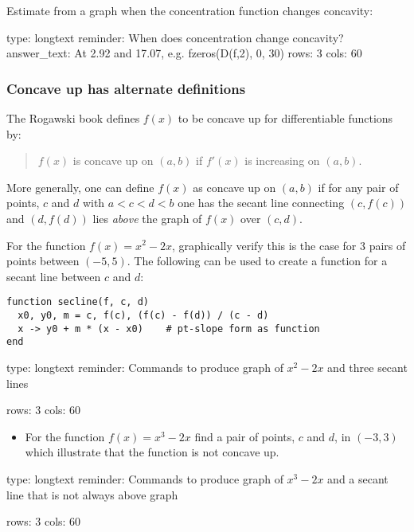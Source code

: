 \documentclass[12pt]{article}
\begin{document}
Estimate from a graph when the concentration function changes concavity:

\begin{answer}
type: longtext
reminder: When does concentration change concavity?
answer_text: At 2.92 and 17.07, e.g. fzeros(D(f,2), 0, 30) 
rows: 3
cols: 60
\end{answer}

\subsubsection{Concave up has alternate definitions}

The Rogawski book defines $f(x)$ to be concave up for differentiable
functions by:

\begin{quote}
$f(x)$ is concave up on $(a,b)$ if $f'(x)$ is increasing on $(a,b)$.
\end{quote}

More generally, one can define $f(x)$ as concave up on $(a,b)$ if for
any pair of points, $c$ and $d$ with $a < c < d < b$ one has the secant
line connecting $(c,f(c))$ and $(d,f(d))$ lies \emph{above} the graph of
$f(x)$ over $(c,d)$.

For the function $f(x) = x^2 - 2x$, graphically verify this is the case
for 3 pairs of points between $(-5,5)$. The following can be used to
create a function for a secant line between $c$ and $d$:



\begin{verbatim}
function secline(f, c, d)
  x0, y0, m = c, f(c), (f(c) - f(d)) / (c - d)
  x -> y0 + m * (x - x0)    # pt-slope form as function
end
\end{verbatim}
\begin{answer}
type: longtext
reminder: Commands to produce graph of \( x^2 - 2x \) and three secant lines

rows: 3
cols: 60
\end{answer}

\begin{itemize}
\itemsep1pt\parskip0pt
\item
  For the function $f(x) = x^3 - 2x$ find a pair of points, $c$ and $d$,
  in $(-3,3)$ which illustrate that the function is not concave up.
\end{itemize}

\begin{answer}
type: longtext
reminder: Commands to produce graph of \( x^3 - 2x \) and a secant line that is not always above graph

rows: 3
cols: 60
\end{answer}
\end{document}
